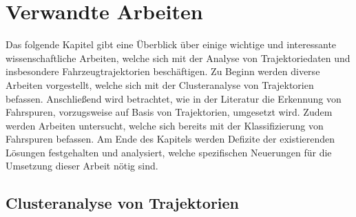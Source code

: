 
\chapter{Verwandte Arbeiten}
\label{cha:related_work}

Das folgende Kapitel gibt eine Überblick über einige wichtige und interessante wissenschaftliche
Arbeiten, welche sich mit der Analyse von Trajektoriedaten und insbesondere Fahrzeugtrajektorien beschäftigen.
Zu Beginn werden diverse Arbeiten vorgestellt, welche sich mit der Clusteranalyse von Trajektorien befassen.
Anschließend wird betrachtet, wie in der Literatur die Erkennung von Fahrspuren, vorzugsweise auf Basis
von Trajektorien, umgesetzt wird.
Zudem werden Arbeiten untersucht, welche sich bereits mit der Klassifizierung von Fahrspuren befassen. %
Am Ende des Kapitels werden Defizite der existierenden Lösungen festgehalten und analysiert, welche
spezifischen Neuerungen für die Umsetzung dieser Arbeit nötig sind.

\section{Clusteranalyse von Trajektorien}
\label{sec:rw_clustering}




